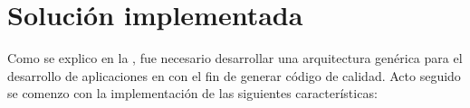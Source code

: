 \chapter{Solución implementada}

Como se explico en la , fue necesario desarrollar una arquitectura genérica para el desarrollo de aplicaciones en \meteorNAME con el fin de generar código de calidad. Acto seguido se comenzo con la implementación de las siguientes características:




















